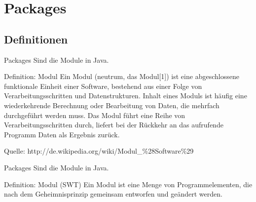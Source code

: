 \documentclass[18pt]{beamer}
\begin{document}
\section{Packages}
\subsection{Definitionen}
\begin{frame}{Packages}
 Sind die Module in Java. \pause
 
 \begin{exampleblock}{Definition: Modul}
  Ein Modul (neutrum, das Modul[1]) ist eine abgeschlossene funktionale Einheit einer Software, 
  bestehend aus einer Folge von Verarbeitungsschritten und Datenstrukturen. Inhalt eines Moduls ist
  häufig eine wiederkehrende Berechnung oder Bearbeitung von Daten, die mehrfach durchgeführt 
  werden muss. Das Modul führt eine Reihe von Verarbeitungsschritten durch, liefert bei der 
  Rückkehr an das aufrufende Programm Daten als Ergebnis zurück.
  
  \tiny{Quelle: http://de.wikipedia.org/wiki/Modul\_\%28Software\%29 }
 \end{exampleblock}

\end{frame}

\begin{frame}{Packages}
 Sind die Module in Java. \pause
 
 \begin{exampleblock}{Definition: Modul (SWT)}
 Ein Modul ist eine Menge von Programmelementen, die nach dem Geheimnisprinzip gemeinsam entworfen und geändert werden.

 \end{exampleblock}

\end{frame}
\end{document}
